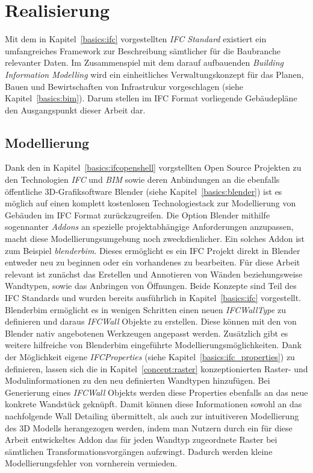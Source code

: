 \chapter{Realisierung}
Mit dem in Kapitel~\ref{basics:ifc} vorgestellten \textit{IFC Standard} existiert ein umfangreiches Framework zur Beschreibung sämtlicher für die Baubranche relevanter Daten. 
Im Zusammenspiel mit dem darauf aufbauenden \textit{Building Information Modelling} wird ein einheitliches Verwaltungskonzept für das Planen, Bauen und Bewirtschaften von Infrastrukur vorgeschlagen (siehe Kapitel~\ref{basics:bim}).
Darum stellen im IFC Format vorliegende Gebäudepläne den Ausgangspunkt dieser Arbeit dar.

\section{Modellierung}
Dank den in Kapitel~\ref{basics:ifcopenshell} vorgstellten Open Source Projekten zu den Technologien \textit{IFC} und \textit{BIM} sowie deren Anbindungen an die ebenfalls öffentliche 3D-Grafiksoftware Blender (siehe Kapitel~\ref{basics:blender}) ist es möglich auf einen komplett kostenlosen Technologiestack zur Modellierung von Gebäuden im IFC Format zurückzugreifen.
Die Option Blender mithilfe sogennanter \textit{Addons} an spezielle projektabhängige Anforderungen anzupassen, macht diese Modellierungsumgebung noch zweckdienlicher.
Ein solches Addon ist zum Beispiel \textit{blenderbim}. 
Dieses ermöglicht es ein IFC Projekt direkt in Blender entweder neu zu beginnen oder ein vorhandenes zu bearbeiten.
Für diese Arbeit relevant ist zunächst das Erstellen und Annotieren von Wänden beziehungsweise Wandtypen, sowie das Anbringen von Öffnungen.
Beide Konzepte sind Teil des IFC Standards und wurden bereits ausführlich in Kapitel~\ref{basics:ifc} vorgestellt.
Blenderbim ermöglicht es in wenigen Schritten einen neuen \textit{IFCWallType} zu definieren und daraus \textit{IFCWall} Objekte zu erstellen.
Diese können mit den von Blender nativ angebotenen Werkzeugen angepasst werden.
Zusätzlich gibt es weitere hilfreiche von Blenderbim eingeführte Modellierungsmöglichkeiten.
Dank der Möglichkeit eigene \textit{IFCProperties} (siehe Kapitel~\ref{basics:ifc_properties}) zu definieren, lassen sich die in Kapitel~\ref{concept:raster} konzeptionierten Raster- und Modulinformationen zu den neu definierten Wandtypen hinzufügen.
Bei Generierung eines \textit{IFCWall} Objekts werden diese Properties ebenfalls an das neue konkrete Wandstück geknüpft.
Damit können diese Informationen sowohl an das nachfolgende Wall Detailing übermittelt, als auch zur intuitiveren Modellierung des 3D Modells herangezogen werden, indem man Nutzern durch ein für diese Arbeit entwickeltes Addon das für jeden Wandtyp zugeordnete Raster bei sämtlichen Transformationsvorgängen aufzwingt.
Dadurch werden kleine Modellierungsfehler von vornherein vermieden.

